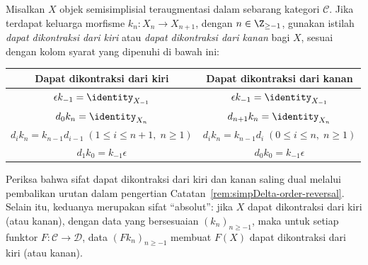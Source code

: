 \begin{definition}\label{def:contractible-aug}
	Misalkan $X$ objek semisimplisial teraugmentasi dalam sebarang kategori
	$\mathcal{C}$. Jika terdapat keluarga morfisme
	$k_n:X_n\to X_{n+1}$, dengan $n\in\Z_{\geq-1}$, gunakan istilah
	\emph{dapat dikontraksi dari kiri} atau \emph{dapat dikontraksi dari
	kanan} bagi $X$, sesuai dengan kolom syarat yang dipenuhi di bawah ini:
	\begin{center}
	\begin{tabular}{|c|c|}\hline
		Dapat dikontraksi dari kiri&Dapat dikontraksi dari kanan\\\hline
		$\epsilon k_{-1}=\identity_{X_{-1}}$
		&$\epsilon k_{-1}=\identity_{X_{-1}}$\\
		$d_0k_n=\identity_{X_n}$
		&$d_{n+1}k_n=\identity_{X_n}$\\
		$d_ik_n=k_{n-1}d_{i-1}\;(1\leq i\leq n+1,\;n\geq1)$
		&$d_ik_n=k_{n-1}d_i\;(0\leq i\leq n,\;n\geq1)$\\
		$d_1k_0=k_{-1}\epsilon$
		&$d_0k_0=k_{-1}\epsilon$\\\hline
	\end{tabular}
	\end{center}
\end{definition}

Periksa bahwa sifat dapat dikontraksi dari kiri dan kanan
saling dual melalui pembalikan urutan dalam pengertian
Catatan~\ref{rem:simpDelta-order-reversal}. Selain itu, keduanya merupakan
sifat ``absolut'': jika $X$ dapat dikontraksi dari kiri (atau kanan), dengan
data yang bersesuaian $(k_n)_{n\geq-1}$, maka untuk setiap funktor
$F:\mathcal{C}\to\mathcal{D}$, data $(Fk_n)_{n\geq-1}$ membuat $F(X)$
dapat dikontraksi dari kiri (atau kanan).

